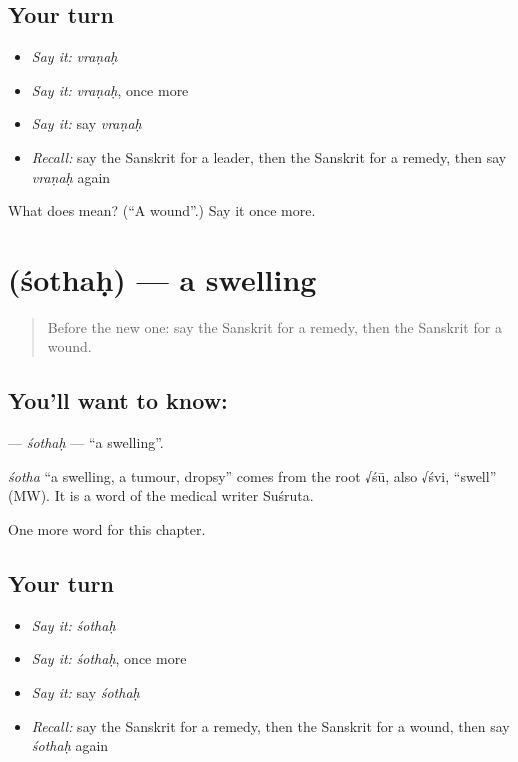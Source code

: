 \subsection*{Your turn}
\begin{itemize}
\raggedright
  \item \emph{Say it:} \emph{vraṇaḥ}
  \item \emph{Say it:} \emph{vraṇaḥ}, once more
  \item \emph{Say it:} say \emph{vraṇaḥ}
  \item \emph{Recall:} say the Sanskrit for a leader, then the Sanskrit for a remedy, then say \emph{vraṇaḥ} again
\end{itemize}

\begin{tcolorbox}[breakable,colback=teal!4,colframe=teal!35!black,title={Before you move on}]
What does  mean? (\textquotedblleft{}A wound\textquotedblright{}.) Say it once more.
\end{tcolorbox}
\section[\texorpdfstring{\sk{शोथः} (śothaḥ)}{शोथः (śothaḥ)}]{ (śothaḥ) — a swelling}

\label{lesson:SA-C150-sothah}



\begin{quote}
Before the new one: say the Sanskrit for a remedy, then the Sanskrit for a wound.
\end{quote}

\subsection*{You'll want to know: }
\textbf{} — \emph{śothaḥ} — \textquotedblleft{}a swelling\textquotedblright{}.

\begin{cousinweb}
\emph{śotha} \textquotedblleft{}a swelling, a tumour, dropsy\textquotedblright{} comes from the root √śū, also √śvi, \textquotedblleft{}swell\textquotedblright{} (MW). It is a word of the medical writer Suśruta.
\end{cousinweb}

\begin{grammarlens}[title={What you've built}]
One more word for this chapter.
\end{grammarlens}

\subsection*{Your turn}
\begin{itemize}
\raggedright
  \item \emph{Say it:} \emph{śothaḥ}
  \item \emph{Say it:} \emph{śothaḥ}, once more
  \item \emph{Say it:} say \emph{śothaḥ}
  \item \emph{Recall:} say the Sanskrit for a remedy, then the Sanskrit for a wound, then say \emph{śothaḥ} again
\end{itemize}


